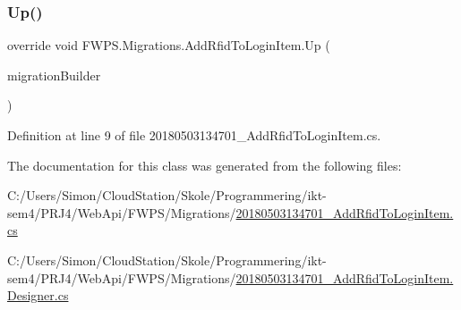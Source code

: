 \subsubsection{\texorpdfstring{Up()}{Up()}}
{\footnotesize\ttfamily override void F\+W\+P\+S.\+Migrations.\+Add\+Rfid\+To\+Login\+Item.\+Up (\begin{DoxyParamCaption}\item[{Migration\+Builder}]{migration\+Builder }\end{DoxyParamCaption})\hspace{0.3cm}{\ttfamily [protected]}}



Definition at line 9 of file 20180503134701\+\_\+\+Add\+Rfid\+To\+Login\+Item.\+cs.



The documentation for this class was generated from the following files\+:\begin{DoxyCompactItemize}
\item 
C\+:/\+Users/\+Simon/\+Cloud\+Station/\+Skole/\+Programmering/ikt-\/sem4/\+P\+R\+J4/\+Web\+Api/\+F\+W\+P\+S/\+Migrations/\mbox{\hyperlink{20180503134701___add_rfid_to_login_item_8cs}{20180503134701\+\_\+\+Add\+Rfid\+To\+Login\+Item.\+cs}}\item 
C\+:/\+Users/\+Simon/\+Cloud\+Station/\+Skole/\+Programmering/ikt-\/sem4/\+P\+R\+J4/\+Web\+Api/\+F\+W\+P\+S/\+Migrations/\mbox{\hyperlink{20180503134701___add_rfid_to_login_item_8_designer_8cs}{20180503134701\+\_\+\+Add\+Rfid\+To\+Login\+Item.\+Designer.\+cs}}\end{DoxyCompactItemize}
